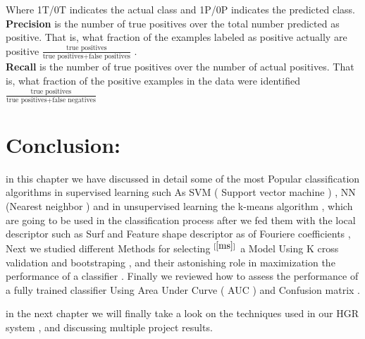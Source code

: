 Where 1T/0T indicates the actual class and 1P/0P indicates the predicted class.\\
\textbf{Precision} is the number of true positives over the total number predicted as positive. That is, what fraction of the examples labeled as positive actually are positive  $\frac{\text{true positives}}{\text{true positives} + \text{false positives}}$ .\\
\textbf{Recall} is the number of true positives over the number of actual positives. That is, what fraction of the positive examples in the data were identified  $\frac{\text{true positives}}{\text{true positives} + \text{false negatives}}$


\section{Conclusion:}

in this chapter we have discussed in detail some of the most Popular classification algorithms in supervised  learning such As SVM ( Support vector machine ) , NN (Nearest neighbor ) and in  unsupervised learning the  k-means algorithm  , which are going to be used in the classification process after we fed them with the local descriptor such as Surf and Feature shape descriptor as of Fouriere coefficients ,  Next we studied different Methods for selecting $^{[\ref{ms}]}$ a Model Using K cross validation and bootstraping , and their astonishing role in maximization the performance of a classifier .
Finally we reviewed  how to  assess the performance of a fully trained classifier Using Area Under Curve ( AUC ) and Confusion matrix .

in the next chapter we will finally take a look on the techniques used in our HGR system  , and discussing multiple  project results.    



